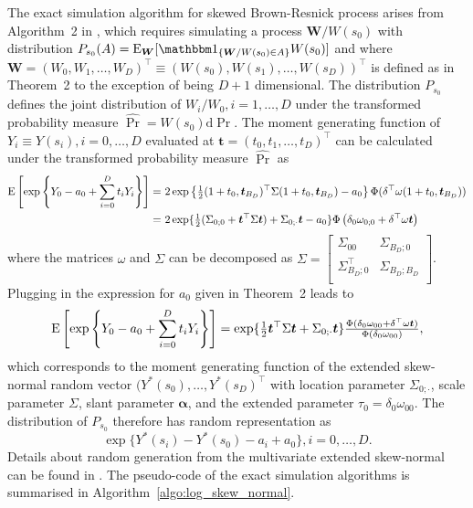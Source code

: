 \documentclass[12pt]{article}
\begin{document}
The exact simulation algorithm for skewed Brown-Resnick process arises from Algorithm~2 in \cite{Dombry.Engelke.Oesting:2016}, which requires simulating a process $\bm W/W(s_0)$ with distribution $P_{s_0}(A) = \E_{\bm W}[\mathbbm 1_{\{\bm W/W(s_0)\in A\}}W(s_0)]$ and where $\bm W = (W_0, W_1, \ldots, W_D)^\top \equiv \left( W(s_0), W(s_1), \ldots, W(s_D)\right)^\top$  is  defined as in Theorem~2 to the exception of being $D+1$ dimensional.
The distribution $P_{s_0}$ defines the joint distribution of $W_i/W_0, i=1,\dots,D$ under the transformed probability measure $\hat \Pr = W(s_0)\text{d}\Pr$. The moment generating function of $Y_i \equiv Y(s_i),i=0,\dots,D$ evaluated at $\bm t = (t_0, t_1, \ldots, t_D)^\top$ can be calculated under the transformed probability measure $\hat\Pr$ as
\begin{align*}
	{\rm E}\left[\exp\left\{Y_0-a_0 + \sum_{i=0}^D t_i Y_i\right\}\right]
	=&\ 2\exp\left\{{\textstyle{1\over2}}(1+t_0,\bm t_{B_D})^\top\Sigma(1+t_0,\bm t_{B_D})-a_0 \right\} \Phi(\delta^\top\omega(1+t_0,\bm t_{B_D}))\\
	 =&\ 2\exp\{{\textstyle{1\over2}}(\Sigma_{0;0} + \bm t^\top\Sigma \bm t) + \Sigma_{0;\cdot} \bm t - a_0\}\Phi\left(\delta_0\omega_{0;0} + \delta^\top\omega \bm t\right) 
\end{align*}        
where the matrices $\omega$ and $\Sigma$ can be decomposed as $\Sigma = \begin{bmatrix}
	\Sigma_{00} & \Sigma_{B_D;0} \\
	\Sigma_{B_D;0}^\top & \Sigma_{B_D;B_D} \\
\end{bmatrix}$. 
%
Plugging in the expression for $a_0$ given in Theorem~2 leads to 
%
\begin{equation*}
{\rm E}\left[\exp\left\{Y_0-a_0 + \sum_{i=0}^D t_i Y_i\right\}\right] = \exp\{{\textstyle{1\over2}} \bm t^\top\Sigma \bm t + \Sigma_{0;\cdot} \bm t \} 
{\textstyle{\Phi(\delta_0\omega_{00} + \delta^\top\omega \bm t)\over\Phi(\delta_0\omega_{00})}}, 
\end{equation*}
%
which corresponds to the moment generating function of the extended skew-normal random vector $(Y^*(s_0),\ldots,Y^*(s_D)^\top$ with location parameter $\Sigma_{0;\cdot}$, scale parameter $\Sigma$, slant parameter $\bm\alpha$, and the extended parameter $\tau_0 = \delta_0\omega_{00}$. The distribution of $P_{s_0}$ therefore has random representation as 
%
$$\exp\{Y^*(s_i)-Y^*(s_0)-a_i + a_0\}, i=0,\dots,D.$$
%
Details about random generation from the multivariate extended skew-normal can be found in \citet[Chapter 5.3.3]{Azzalini:2013}. The pseudo-code of the exact simulation algorithms is summarised in Algorithm~\ref{algo:log_skew_normal}.   
\end{document}

